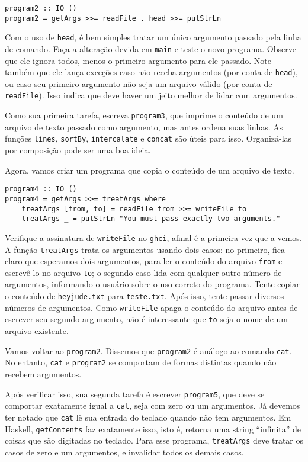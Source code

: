 \documentclass[a4paper]{article}
\begin{document}
\begin{verbatim}
program2 :: IO ()
program2 = getArgs >>= readFile . head >>= putStrLn
\end{verbatim}

Com o uso de \texttt{head}, é bem simples tratar um único argumento passado pela linha de comando.
Faça a alteração devida em \texttt{main} e teste o novo programa.
Observe que ele ignora todos, menos o primeiro argumento para ele passado.
Note também que ele lança exceções caso não receba argumentos (por conta de \texttt{head}), ou caso seu primeiro argumento não seja um arquivo válido (por conta de \texttt{readFile}).
Isso indica que deve haver um jeito melhor de lidar com argumentos.

Como sua primeira tarefa, escreva \texttt{program3}, que imprime o conteúdo de um arquivo de texto passado como argumento, mas antes ordena suas linhas.
As funções \texttt{lines}, \texttt{sortBy}, \texttt{intercalate} e \texttt{concat} são úteis para isso.
Organizá-las por composição pode ser uma boa ideia.

Agora, vamos criar um programa que copia o conteúdo de um arquivo de texto.

\begin{verbatim}
program4 :: IO ()
program4 = getArgs >>= treatArgs where
	treatArgs [from, to] = readFile from >>= writeFile to
	treatArgs _ = putStrLn "You must pass exactly two arguments."
\end{verbatim}

Verifique a assinatura de \texttt{writeFile} no \texttt{ghci}, afinal é a primeira vez que a vemos.
A função \texttt{treatArgs} trata os argumentos usando dois casos:
no primeiro, fica claro que esperamos dois argumentos, para ler o conteúdo do arquivo \texttt{from} e escrevê-lo no arquivo \texttt{to};
o segundo caso lida com qualquer outro número de argumentos, informando o usuário sobre o uso correto do programa.
Tente copiar o conteúdo de \texttt{heyjude.txt} para \texttt{teste.txt}.
Após isso, tente passar diversos números de argumentos.
Como \texttt{writeFile} apaga o conteúdo do arquivo antes de escrever seu segundo argumento, não é interessante que \texttt{to} seja o nome de um arquivo existente.

Vamos voltar ao \texttt{program2}.
Dissemos que \texttt{program2} é análogo ao comando \texttt{cat}.
No entanto, \texttt{cat} e \texttt{program2} se comportam de formas distintas quando não recebem argumentos.

Após verificar isso, sua segunda tarefa é escrever \texttt{program5}, que deve se comportar exatamente igual a \texttt{cat}, seja com zero ou um argumentos.
Já devemos ter notado que \texttt{cat} lê sua entrada do teclado quando não tem argumentos.
Em Haskell, \texttt{getContents} faz exatamente isso, isto é, retorna uma string ``infinita'' de coisas que são digitadas no teclado.
Para esse programa, \texttt{treatArgs} deve tratar os casos de zero e um argumentos, e invalidar todos os demais casos.
\end{document}
